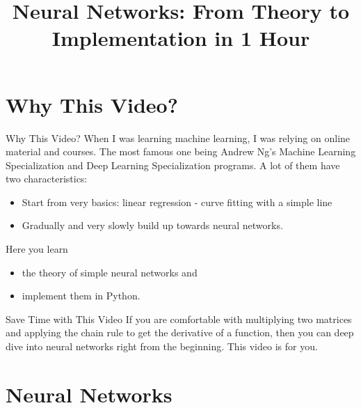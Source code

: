 \documentclass{beamer}
\title{Neural Networks: From Theory to Implementation in 1 Hour}
\begin{document}
\frame{\titlepage}

\section{Why This Video?}

\begin{frame}{Why This Video?}
When I was learning machine learning, I was relying on online material and courses. The most famous one being Andrew Ng's Machine Learning Specialization and Deep Learning Specialization programs. A lot of them have two characteristics:

\begin{itemize}
    \item Start from very basics: linear regression - curve fitting with a simple line
    \item Gradually and very slowly build up towards neural networks. 
\end{itemize}

Here you learn
\begin{itemize}
    \item the theory of simple neural networks and
    \item implement them in Python.
\end{itemize}


\end{frame}

\begin{frame}{Save Time with This Video}
If you are comfortable with multiplying two matrices and applying the chain rule to get the derivative of a function, then you can deep dive into neural networks right from the beginning. This video is for you.
\end{frame}

\section{Neural Networks}
\end{document}
